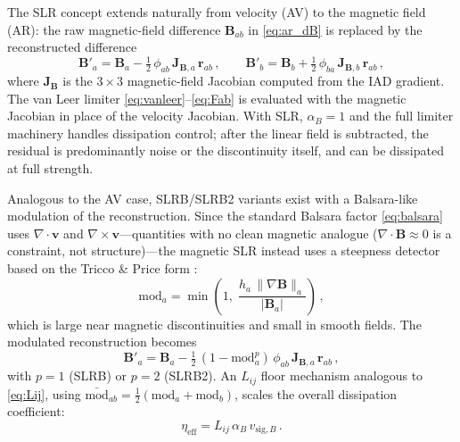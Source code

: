 The SLR concept extends naturally from velocity (AV) to the magnetic field (AR): the raw magnetic-field difference $\mathbf{B}_{ab}$ in \eqref{eq:ar_dB} is replaced by the reconstructed difference
\begin{equation}
    \mathbf{B}'_a = \mathbf{B}_a - \tfrac{1}{2}\,\phi_{ab}\, \mathbf{J}_{\mathbf{B},a}\, \mathbf{r}_{ab}\,, \qquad
    \mathbf{B}'_b = \mathbf{B}_b + \tfrac{1}{2}\,\phi_{ba}\, \mathbf{J}_{\mathbf{B},b}\, \mathbf{r}_{ab}\,,
    \label{eq:slr_B}
\end{equation}
where $\mathbf{J}_\mathbf{B}$ is the $3 \times 3$ magnetic-field Jacobian computed from the IAD gradient. The van Leer limiter \eqref{eq:vanleer}--\eqref{eq:Fab} is evaluated with the magnetic Jacobian in place of the velocity Jacobian. With SLR, $\alpha_B = 1$ and the full limiter machinery handles dissipation control; after the linear field is subtracted, the residual is predominantly noise or the discontinuity itself, and can be dissipated at full strength.

Analogous to the AV case, SLRB/SLRB2 variants exist with a Balsara-like modulation of the reconstruction. Since the standard Balsara factor \eqref{eq:balsara} uses $\nabla \cdot \mathbf{v}$ and $\nabla \times \mathbf{v}$---quantities with no clean magnetic analogue ($\nabla \cdot \mathbf{B} \approx 0$ is a constraint, not structure)---the magnetic SLR instead uses a steepness detector based on the Tricco \& Price form \cite{TriccoPrice2013}:
\begin{equation}
    \mathrm{mod}_a = \min\!\left(1,\; \frac{h_a\, \|\nabla \mathbf{B}\|_a}{|\mathbf{B}_a|}\right)\,,
    \label{eq:slr_modulator}
\end{equation}
which is large near magnetic discontinuities and small in smooth fields. The modulated reconstruction becomes
\begin{equation}
    \mathbf{B}'_a = \mathbf{B}_a - \tfrac{1}{2}\,(1 - \mathrm{mod}_a^p)\,\phi_{ab}\, \mathbf{J}_{\mathbf{B},a}\, \mathbf{r}_{ab}\,,
    \label{eq:slr_B_mod}
\end{equation}
with $p = 1$ (SLRB) or $p = 2$ (SLRB2). An $L_{ij}$ floor mechanism analogous to \eqref{eq:Lij}, using $\bar{\mathrm{mod}}_{ab} = \tfrac{1}{2}(\mathrm{mod}_a + \mathrm{mod}_b)$, scales the overall dissipation coefficient:
\begin{equation}
    \eta_\mathrm{eff} = L_{ij}\, \alpha_B\, v_{\mathrm{sig},B}\,.
    \label{eq:ar_Lij}
\end{equation}


